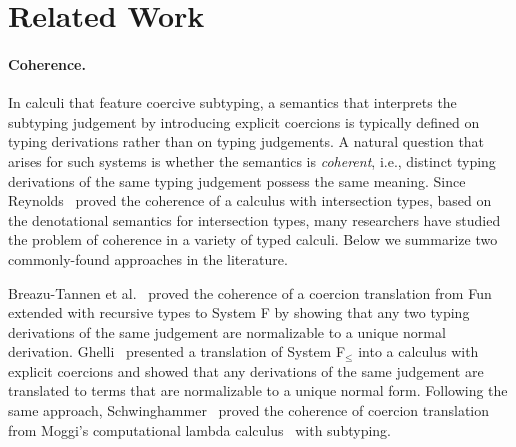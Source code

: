 
\section{Related Work}
\label{sec:related}

\paragraph{Coherence.}
In calculi that feature coercive subtyping, a semantics that interprets the
subtyping judgement by introducing explicit coercions is typically defined on
typing derivations rather than on typing judgements. A natural
question that arises
for such systems is whether the semantics is \textit{coherent}, i.e.,
distinct typing derivations of the same typing judgement possess the same
meaning. Since Reynolds~\citep{Reynolds_1991} proved the coherence of a calculus with
intersection types, based on the denotational semantics for intersection types,
many researchers have studied the problem of coherence in a variety of typed
calculi. Below we summarize two commonly-found approaches in the literature.

Breazu-Tannen et al.~\citep{Breazu_Tannen_1991} proved
the coherence of a coercion translation from Fun~\citep{cardelli1985understanding}
extended with recursive types to System F by showing that any two
typing derivations of the same judgement are normalizable to a unique
normal derivation. %
Ghelli~\citep{Curien_1992} presented a translation of System F$_\leq$ into a calculus
with explicit coercions and showed that any derivations of the same judgement are
translated to terms that are normalizable to a unique normal form. Following the
same approach, Schwinghammer~\citep{SCHWINGHAMMER_2008} proved the coherence of coercion
translation from Moggi's computational lambda calculus~\citep{Moggi_1991} with subtyping.



